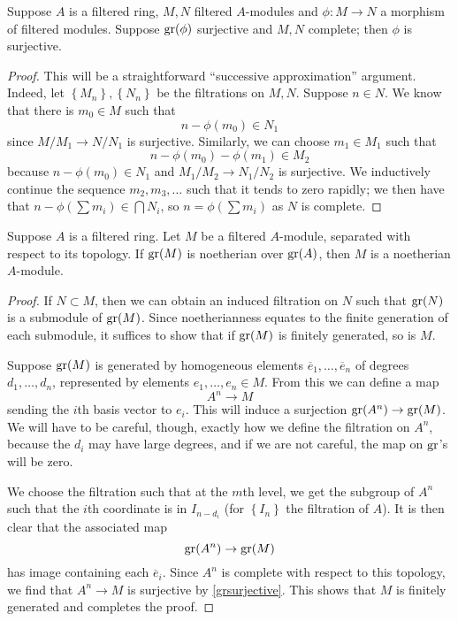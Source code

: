 \begin{lemma} \label{grsurjective}
Suppose $A$ is a filtered ring, $M, N$ filtered $A$-modules and $\phi: M \to N$ a
morphism of filtered modules. Suppose $\operatorname{gr}(\phi)$ surjective and $M, N$
complete; then $\phi$ is surjective.
\end{lemma} 
\begin{proof} This will be a straightforward ``successive approximation''
argument. 
Indeed, let $\left\{M_n\right\}, \left\{N_n\right\}$ be the filtrations on $M,
N$. 
Suppose $n \in N$.
We know that there is $m_0 \in M$ such that
\[ n -  \phi(m_0) \in N_1  \]
since $M/M_1 \to N/N_1 $ is surjective. 
Similarly, we can choose $m_1 \in M_1$ such that 
\[ n - \phi(m_0) -  \phi(m_1)  \in M_2  \]
because $n - \phi(m_0) \in N_1$ and $M_1/M_2 \to N_1/N_2$ is surjective. We
inductively continue the sequence $m_2, m_3, \dots$ such that it tends to zero
rapidly; we then have that $n - \phi\left( \sum m_i \right) \in \bigcap N_i$,
so $n = \phi\left(\sum m_i\right)$ as $N$ is complete.
\end{proof} 



\begin{theorem} \label{grnoetherian}
Suppose $A$ is a filtered ring. Let $M$ be a filtered $A$-module, separated
with respect to its topology.
If $\operatorname{gr}(M)$ is noetherian over $\operatorname{gr}(A)$, then $M$ is a noetherian $A$-module. 
\end{theorem} 
\begin{proof}
If $N \subset M$, then we can obtain an induced filtration on $N$ such that
$\operatorname{gr}(N)$ is a submodule of $\operatorname{gr}(M)$. Since noetherianness equates to the
finite generation of each submodule, it suffices to show that if $\operatorname{gr}(M)$ is
finitely generated, so is $M$.

Suppose $\operatorname{gr}(M)$ is generated by homogeneous elements $\overline{e}_1, \dots,
\overline{e}_n$ of
degrees $d_1, \dots, d_n$, represented by elements $e_1, \dots, e_n \in M$. From this we can define a map
\[ A^n \to M  \]
sending the $i$th basis vector to $e_i$. This will induce a  surjection
$\operatorname{gr}(A^n) \to \operatorname{gr}(M)$. We will have to be careful, though, exactly how we
define the filtration on $A^n$, because the $d_i$ may have large degrees, and
if we are not careful, the map on $\operatorname{gr}$'s will be zero.

We choose the filtration such that at the $m$th level, we get the subgroup of
$A^n$ such that the $i$th coordinate is in $I_{n-d_i}$ (for
$\left\{I_n\right\}$ the filtration of $A$). It is then clear that the
associated map
\[ \operatorname{gr}(A^n ) \to \operatorname{gr}(M)  \]
has image containing each $\overline{e}_i$. Since $A^n$ is complete with
respect to this topology, we find that $A^n \to M$ is surjective by
\cref{grsurjective}.
This shows that $M$ is finitely generated and completes the proof.
\end{proof} 


